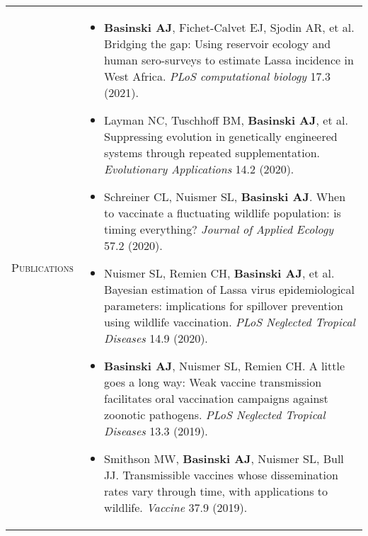\documentclass[11pt]{article}
\newcommand{\cellone}{3.5cm} %
\newcommand{\celltwo}{11cm}
\newcommand{\spa}{\vspace{.4in}}
\begin{document}
\spa
\spa

\begin{tabularx}{\textwidth}{p{\cellone} p{\celltwo}}
  \parbox[t][0cm]{\cellone}{P\textsc{ublications}} &  \parbox[t][0cm]{12cm}{ 

    \vspace{-0.65cm}
    \begin{itemize}

    \item {\bf Basinski AJ}, Fichet-Calvet EJ, Sjodin AR, et al. Bridging the gap: Using reservoir ecology and human sero-surveys to estimate Lassa incidence in West Africa. \emph{PLoS computational biology} 17.3 (2021).

      \vspace{0.05in}      

    \item Layman NC, Tuschhoff BM, {\bf Basinski AJ}, et al. Suppressing evolution in genetically engineered systems through repeated supplementation. \emph{Evolutionary Applications} 14.2 (2020).
      
      \vspace{0.05in}
      
    \item Schreiner CL, Nuismer SL, {\bf Basinski AJ}. When to vaccinate a fluctuating wildlife population: is timing everything? \emph{Journal of Applied Ecology} 57.2 (2020). 

      \vspace{0.05in}      
      
    \item Nuismer SL, Remien CH, {\bf Basinski AJ}, et al. Bayesian estimation of Lassa virus epidemiological parameters: implications for spillover prevention using wildlife vaccination. \emph{PLoS Neglected Tropical Diseases} 14.9 (2020).
      
      \vspace{0.05in}
      
    \item {\bf Basinski AJ}, Nuismer SL, Remien CH. A little goes a long way: Weak vaccine transmission facilitates oral vaccination campaigns against zoonotic pathogens. \emph{PLoS Neglected Tropical Diseases} 13.3 (2019).

      \vspace{0.05in}

      \item Smithson MW, {\bf Basinski AJ}, Nuismer SL, Bull JJ. Transmissible vaccines whose dissemination rates vary through time, with applications to wildlife. \emph{Vaccine} 37.9 (2019).
            
    \end{itemize}
  }
\end{tabularx}
\end{document}
